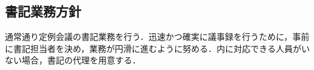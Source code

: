 \subsection*{書記業務方針}


通常通り定例会議の書記業務を行う．迅速かつ確実に議事録を行うために，事前に書記担当者を決め，業務が円滑に進むように努める．\soumuDepartment{}内に対応できる人員がいない場合，書記の代理を用意する．
